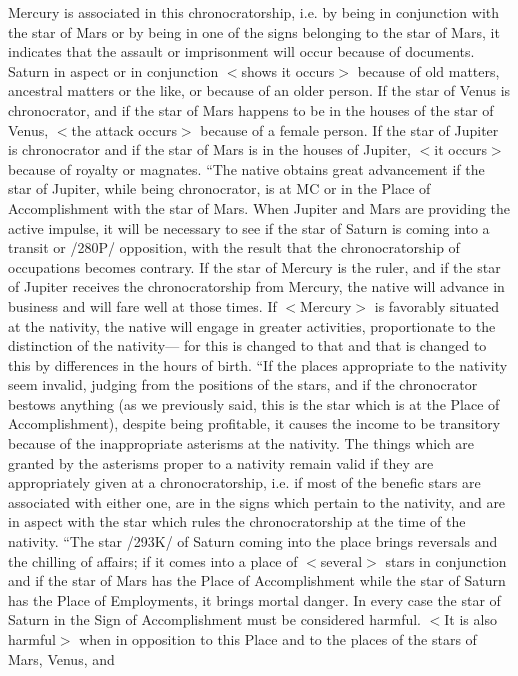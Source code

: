 Mercury is associated in this chronocratorship, i.e. by being in conjunction with the star of Mars or by being in one of the signs belonging to the star of Mars, it indicates that the assault or
imprisonment will occur because of documents. Saturn in aspect or in conjunction $<$shows it
occurs$>$ because of old matters, ancestral matters or the like, or because of an older person. If the star
of Venus is chronocrator, and if the star of Mars happens to be in the houses of the star of Venus,
$<$the attack occurs$>$ because of a female person. If the star of Jupiter is chronocrator and if the star of
Mars is in the houses of Jupiter, $<$it occurs$>$ because of royalty or magnates.
“The native obtains great advancement if the star of Jupiter, while being chronocrator, is at MC or
in the Place of Accomplishment with the star of Mars. When Jupiter and Mars are providing the
active impulse, it will be necessary to see if the star of Saturn is coming into a transit or /280P/
opposition, with the result that the chronocratorship of occupations becomes contrary. If the star of
Mercury is the ruler, and if the star of Jupiter receives the chronocratorship from Mercury, the native
will advance in business and will fare well at those times. If $<$Mercury$>$ is favorably situated at the
nativity, the native will engage in greater activities, proportionate to the distinction of the nativity—
for this is changed to that and that is changed to this by differences in the hours of birth.
“If the places appropriate to the nativity seem invalid, judging from the positions of the stars, and
if the chronocrator bestows anything (as we previously said, this is the star which is at the Place of
Accomplishment), despite being profitable, it causes the income to be transitory because of the
inappropriate asterisms at the nativity. The things which are granted by the asterisms proper to a
nativity remain valid if they are appropriately given at a chronocratorship, i.e. if most of the benefic
stars are associated with either one, are in the signs which pertain to the nativity, and are in aspect
with the star which rules the chronocratorship at the time of the nativity.
“The star /293K/ of Saturn coming into the place brings reversals and the chilling of affairs; if it
comes into a place of $<$several$>$ stars in conjunction and if the star of Mars has the Place of
Accomplishment while the star of Saturn has the Place of Employments, it brings mortal danger. In
every case the star of Saturn in the Sign of Accomplishment must be considered harmful. $<$It is also
harmful$>$ when in opposition to this Place and to the places of the stars of Mars, Venus, and
